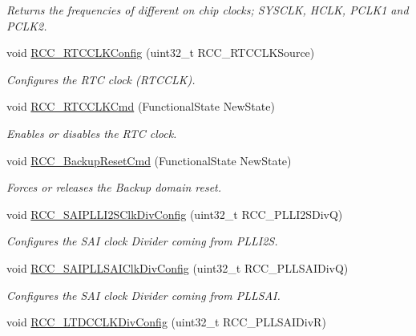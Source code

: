 \begin{DoxyCompactItemize}
\begin{DoxyCompactList}\small\item\em Returns the frequencies of different on chip clocks; S\+Y\+S\+C\+LK, H\+C\+LK, P\+C\+L\+K1 and P\+C\+L\+K2. \end{DoxyCompactList}\item 
void \mbox{\hyperlink{group___r_c_c_ga1473d8a5a020642966359611c44181b0}{R\+C\+C\+\_\+\+R\+T\+C\+C\+L\+K\+Config}} (uint32\+\_\+t R\+C\+C\+\_\+\+R\+T\+C\+C\+L\+K\+Source)
\begin{DoxyCompactList}\small\item\em Configures the R\+TC clock (R\+T\+C\+C\+LK). \end{DoxyCompactList}\item 
void \mbox{\hyperlink{group___r_c_c_ga9802f84846df2cea8e369234ed13b159}{R\+C\+C\+\_\+\+R\+T\+C\+C\+L\+K\+Cmd}} (Functional\+State New\+State)
\begin{DoxyCompactList}\small\item\em Enables or disables the R\+TC clock. \end{DoxyCompactList}\item 
void \mbox{\hyperlink{group___r_c_c_ga636c3b72f35391e67f12a551b15fa54a}{R\+C\+C\+\_\+\+Backup\+Reset\+Cmd}} (Functional\+State New\+State)
\begin{DoxyCompactList}\small\item\em Forces or releases the Backup domain reset. \end{DoxyCompactList}\item 
void \mbox{\hyperlink{group___r_c_c_ga71a887e0e7ef3d49ff87f2cbc435b099}{R\+C\+C\+\_\+\+S\+A\+I\+P\+L\+L\+I2\+S\+Clk\+Div\+Config}} (uint32\+\_\+t R\+C\+C\+\_\+\+P\+L\+L\+I2\+S\+DivQ)
\begin{DoxyCompactList}\small\item\em Configures the S\+AI clock Divider coming from P\+L\+L\+I2S. \end{DoxyCompactList}\item 
void \mbox{\hyperlink{group___r_c_c_gabefc354915bd57804329349ec3f33fab}{R\+C\+C\+\_\+\+S\+A\+I\+P\+L\+L\+S\+A\+I\+Clk\+Div\+Config}} (uint32\+\_\+t R\+C\+C\+\_\+\+P\+L\+L\+S\+A\+I\+DivQ)
\begin{DoxyCompactList}\small\item\em Configures the S\+AI clock Divider coming from P\+L\+L\+S\+AI. \end{DoxyCompactList}\item 
void \mbox{\hyperlink{group___r_c_c_gac04a91996aefd2a517cf90c2a44830d2}{R\+C\+C\+\_\+\+L\+T\+D\+C\+C\+L\+K\+Div\+Config}} (uint32\+\_\+t R\+C\+C\+\_\+\+P\+L\+L\+S\+A\+I\+DivR)

\end{DoxyCompactItemize}

